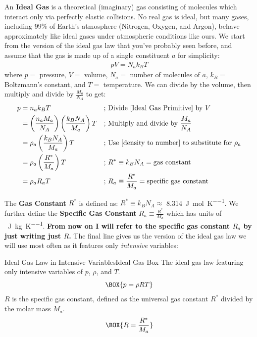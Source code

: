 An \textbf{Ideal Gas} is a theoretical (imaginary) gas consisting of molecules which interact only via perfectly elastic collisions. No real gas is ideal, but many gases, including 99\% of Earth's atmosphere (Nitrogen, Oxygen, and Argon), behave approximately like ideal gases under atmospheric conditions like ours. We start from the version of the ideal gas law that you've probably seen before, and assume that the gas is made up of a single constituent $a$ for simplicity:
\begin{align}\label{Ideal Gas Primitive}
    \boxed{pV=N_ak_BT}
\end{align}
where $p=$ pressure, $V=$ volume, $N_a=$ number of molecules of $a$, $k_B=$ Boltzmann's constant, and $T=$ temperature. We can divide by the volume, then multiply and divide by $\frac{M_a}{N_A}$ to get: 
\begin{align*}
    p&=n_ak_BT & \text{; }&\text{Divide \ref{Ideal Gas Primitive} by }V\\
    &=\left(\frac{n_aM_a}{N_A}\right)\left(\frac{k_BN_A}{M_a}\right)T&\text{; }&\text{Multiply and divide by }\frac{M_a}{N_A}\\
    &=\rho_a\left(\frac{k_BN_A}{M_a}\right)T & \text{; }& \text{Use \ref{density to number} to substitute for }\rho_a\\
    &=\rho_a\left(\frac{R^*}{M_a}\right)T
    &\text{; }&R^*\equiv k_BN_A=\text{gas constant}\\
    &=\rho_aR_aT
    &\text{; }&R_a\equiv\frac{R^*}{M_a}=\text{specific gas constant}
\end{align*}

The \textbf{Gas Constant} $R^*$ is defined as: $R^*\equiv k_BN_A\approx$ \qty{8.314}{\joule\per\mole\per\kelvin}. We further define the \textbf{Specific Gas Constant} $R_a\equiv \frac{R^*}{M_a}$ which has units of \qty{}{\joule\per\kilogram\per\kelvin}. \textbf{From now on I will refer to the specific gas constant $R_a$ by just writing just $R$.} The final line gives us the version of the ideal gas law we will use most often as it features only \textit{intensive} variables:
\begin{fact}{Ideal Gas Law in Intensive Variables}{Ideal Gas Box}\label{Ideal Gas Box}
The ideal gas law featuring only intensive variables of $p$, $\rho$, and $T$.
    \begin{equation}\label{Ideal Gas}
    \BOX{
        p=\rho RT
    }
    \end{equation}
 $R$ is the specific gas constant, defined as the universal gas constant $R^*$ divided by the molar mass $M_a$.
    \begin{equation}\label{Specific Gas Constant One}
    \BOX{
        R=\frac{R^*}{M_a}
    }
    \end{equation}
\end{fact}

